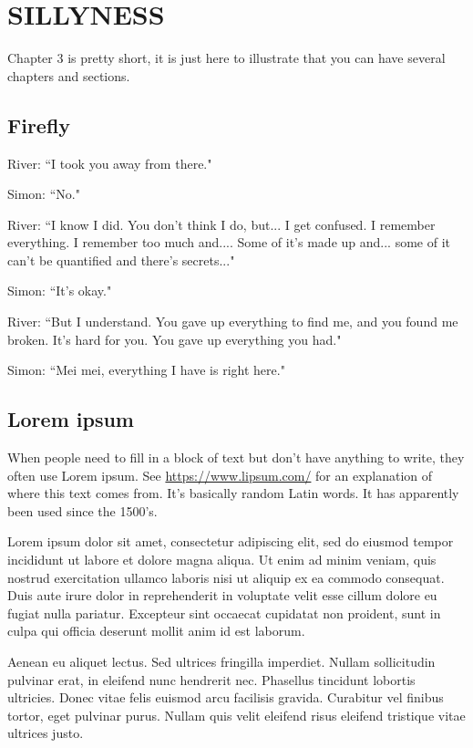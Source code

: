 \chapter{\texorpdfstring{SILLYNESS}{}} %
\setcounter{equation}{0} 

Chapter 3 is pretty short, it is just here to illustrate that you can have several chapters and sections.

\section{Firefly}
River: ``I took you away from there."

Simon: ``No."

River: ``I know I did. You don't think I do, but... I get confused. I remember
everything. I remember too much and.... Some of it's made up and... some of
it can't be quantified and there's secrets..."

Simon: ``It's okay."

River: ``But I understand. You gave up everything to find me, and you found me
broken. It's hard for you. You gave up everything you had."

Simon: ``Mei mei, everything I have is right here."

\section{Lorem ipsum}

When people need to fill in a block of text but don't have anything to write, they often use Lorem ipsum.
See \url{https://www.lipsum.com/} for an explanation of where this text comes from.
It's basically random Latin words.
It has apparently been used since the 1500's.

Lorem ipsum dolor sit amet, consectetur adipiscing elit, sed do eiusmod tempor incididunt ut labore et dolore magna aliqua. Ut enim ad minim veniam, quis nostrud exercitation ullamco laboris nisi ut aliquip ex ea commodo consequat. Duis aute irure dolor in reprehenderit in voluptate velit esse cillum dolore eu fugiat nulla pariatur. Excepteur sint occaecat cupidatat non proident, sunt in culpa qui officia deserunt mollit anim id est laborum.

Aenean eu aliquet lectus. Sed ultrices fringilla imperdiet. Nullam sollicitudin pulvinar erat, in eleifend nunc hendrerit nec. Phasellus tincidunt lobortis ultricies. Donec vitae felis euismod arcu facilisis gravida. Curabitur vel finibus tortor, eget pulvinar purus. Nullam quis velit eleifend risus eleifend tristique vitae ultrices justo.

